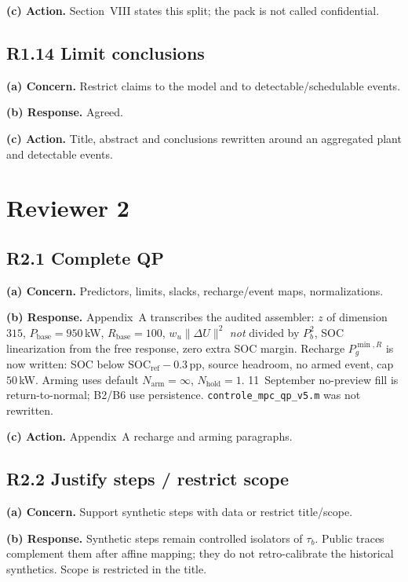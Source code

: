 \documentclass[11pt]{article}
\begin{document}
\textbf{(c) Action.} Section~VIII states this split; the pack is not called confidential.

\subsection*{R1.14 Limit conclusions}
\textbf{(a) Concern.} Restrict claims to the model and to detectable/schedulable events.

\textbf{(b) Response.} Agreed.

\textbf{(c) Action.} Title, abstract and conclusions rewritten around an aggregated plant and detectable events.

\section*{Reviewer 2}

\subsection*{R2.1 Complete QP}
\textbf{(a) Concern.} Predictors, limits, slacks, recharge/event maps, normalizations.

\textbf{(b) Response.} Appendix~A transcribes the audited assembler: $z$ of dimension $315$, $P_{\mathrm{base}}=950$\,kW, $R_{\mathrm{base}}=100$, $w_u\|\Delta U\|^2$ \emph{not} divided by $P_b^2$, SOC linearization from the free response, zero extra SOC margin. Recharge $P_g^{\min,R}$ is now written: SOC below $\mathrm{SOC}_{\mathrm{ref}}-0.3$\,pp, source headroom, no armed event, cap $50$\,kW. Arming uses default $N_{\mathrm{arm}}=\infty$, $N_{\mathrm{hold}}=1$. 11~September no-preview fill is return-to-normal; B2/B6 use persistence. \texttt{controle\_mpc\_qp\_v5.m} was not rewritten.

\textbf{(c) Action.} Appendix~A recharge and arming paragraphs.

\subsection*{R2.2 Justify steps / restrict scope}
\textbf{(a) Concern.} Support synthetic steps with data or restrict title/scope.

\textbf{(b) Response.} Synthetic steps remain controlled isolators of $\tau_b$. Public traces complement them after affine mapping; they do not retro-calibrate the historical synthetics. Scope is restricted in the title.
\end{document}
